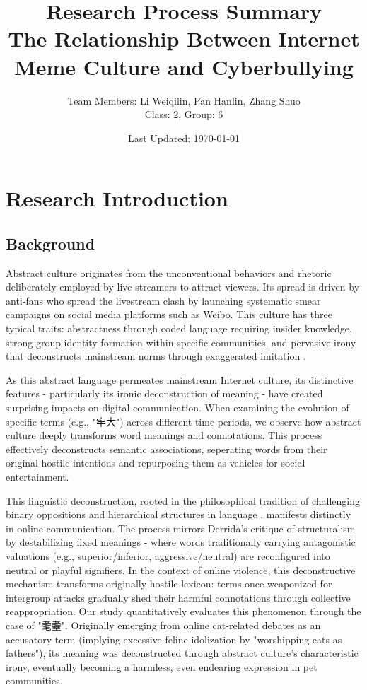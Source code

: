 \documentclass[12pt,a4paper]{ctexart}
\title{
    {\bfseries\fontsize{12}{14}\selectfont Research Process Summary}\\
    {\normalfont\fontsize{11}{13}\selectfont The Relationship Between Internet Meme Culture and Cyberbullying}
}
\author{
    {\normalfont\fontsize{11}{13}\selectfont Team Members: Li Weiqilin, Pan Hanlin, Zhang Shuo}\\
    {\normalfont\fontsize{11}{13}\selectfont Class: 2, Group: 6}
}
\date{Last Updated: \today}
\begin{document}
\maketitle
\tableofcontents
\newpage

\section{Research Introduction}
\subsection{Background}

Abstract culture originates from the unconventional behaviors and rhetoric deliberately employed by live streamers to attract viewers. Its spread is driven by anti-fans who spread the livestream clash by launching systematic smear campaigns on social media platforms such as Weibo. This culture has three typical traits: abstractness through coded language requiring insider knowledge, strong group identity formation within specific communities, and pervasive irony that deconstructs mainstream norms through exaggerated imitation \cite{zheng2024chinese}.

As this abstract language permeates mainstream Internet culture, its distinctive features - particularly its ironic deconstruction of meaning - have created surprising impacts on digital communication. When examining the evolution of specific terms (e.g., "牢大") across different time periods, we observe how abstract culture deeply transforms word meanings and connotations. This process effectively deconstructs semantic associations, seperating words from their original hostile intentions and repurposing them as vehicles for social entertainment.

This linguistic deconstruction, rooted in the philosophical tradition of challenging binary oppositions and hierarchical structures in language \cite{liu2019deconstruction}, manifests distinctly in online communication. The process mirrors Derrida's critique of structuralism by destabilizing fixed meanings - where words traditionally carrying antagonistic valuations (e.g., superior/inferior, aggressive/neutral) are reconfigured into neutral or playful signifiers. In the context of online violence, this deconstructive mechanism transforms originally hostile lexicon: terms once weaponized for intergroup attacks gradually shed their harmful connotations through collective reappropriation. Our study quantitatively evaluates this phenomenon through the case of "耄耋". Originally emerging from online cat-related debates as an accusatory term (implying excessive feline idolization by "worshipping cats as fathers"), its meaning was deconstructed through abstract culture's characteristic irony, eventually becoming a harmless, even endearing expression in pet communities.
\end{document}
